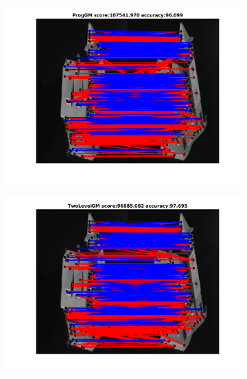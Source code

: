 \documentclass[
	fontsize=12pt,
	paper=a4,
	twoside=false,
	numbers=noenddot,
	plainheadsepline,
	toc=listof,
	toc=bibliography
]{scrartcl}
\begin{document}
\begin{figure}[h] 
	\begin{subfigure}[b]{0.3\textwidth}
		\centering
		\includegraphics[scale=0.25]{"fig_ver2608/RealImages/HouseSeq/anchor_descr/using_cpd_afftrafo/ext_solution/fi_1_ProgGM"}  
	\end{subfigure}%
	\begin{subfigure}[b]{0.3\textwidth}
		\centering
		\includegraphics[scale=0.25]{"fig_ver2608/RealImages/HouseSeq/anchor_descr/using_cpd_afftrafo/ext_solution/fi_1_TwoLevelGM"}  
	\end{subfigure} 
	\begin{subfigure}[b]{0.3\textwidth}
		\centering

\end{subfigure}
\end{figure}
\end{document}
